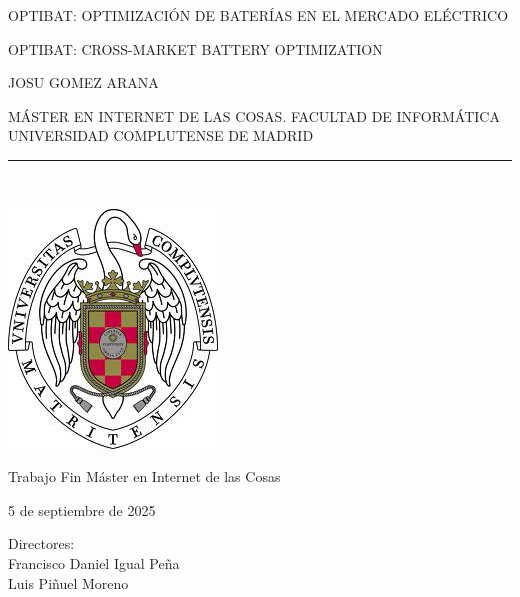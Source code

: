\newpage

\thispagestyle{empty}

\begin{center}

  \vspace{1cm}

  {\large OPTIBAT\@: OPTIMIZACIÓN DE BATERÍAS EN EL MERCADO ELÉCTRICO}\\

  \vspace{0.5cm}

  {\large OPTIBAT\@: CROSS-MARKET BATTERY OPTIMIZATION}\\

  \vspace{0.5cm}

  \vspace{0.5cm}

  {\large JOSU GOMEZ ARANA}\\

  \vspace{0.5cm}

  MÁSTER EN INTERNET DE LAS COSAS\@. FACULTAD DE INFORMÁTICA\\
  UNIVERSIDAD COMPLUTENSE DE MADRID\\

  \vspace{0.65cm}

  \rule{2in}{0.5pt}\\

  \vspace{0.85cm}

  \includegraphics[height=2.5in]{figures/escudo.jpg}

  \vspace{0.5cm}

  Trabajo Fin Máster en Internet de las Cosas

  \vspace{0.5cm}

  5 de septiembre de 2025\\

  \vspace{1cm}

\end{center}

{\raggedleft%
  Directores:\\
  \vspace{1cm}
  Francisco Daniel Igual Peña\\
  Luis Piñuel Moreno\\
}
